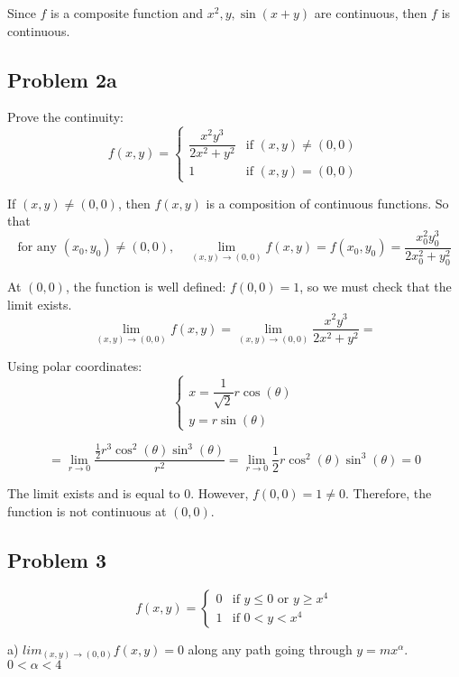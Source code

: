 \documentclass[11pt]{article}
\begin{document}
Since $f$ is a composite function and $x^2, y, \sin(x + y)$ are continuous, then $f$ is continuous.

\subsection*{Problem 2a}
Prove the continuity:
\[
f(x,y) = 
\begin{cases}
    \dfrac{x^2y^3}{2x^2 + y^2} & \text{if } (x,y) \neq (0,0) \\
    1 & \text{if } (x,y) = (0,0)
\end{cases}
\]

If $(x,y) \neq (0,0)$, then $f(x,y)$ is a composition of continuous functions. So that 
\[
\text{for any } (x_0,y_0) \neq (0,0), \quad \lim_{(x,y) \to (0,0)} f(x,y) = f(x_0,y_0) = \dfrac{x_0^2y_0^3}{2x_0^2 + y_0^2}
\]

At $(0,0)$, the function is well defined: $f(0,0) = 1$, so we must check that the limit exists.
\[
\lim_{(x,y) \to (0,0)} f(x,y) = \lim_{(x,y) \to (0,0)} \frac{x^2y^3}{2x^2 + y^2} = 
\]

Using polar coordinates:
\[
\begin{cases}
    x = \dfrac{1}{\sqrt{2}}r \cos(\theta) \\
    y = r \sin(\theta)
\end{cases}
\]

\[
= \lim_{r \to 0} \dfrac{\frac{1}{2} r^3 \cos^2(\theta) \sin^3(\theta)}{r^2} = \lim_{r \to 0} \frac{1}{2} r \cos^2(\theta) \sin^3(\theta) = 0
\]

The limit exists and is equal to 0. However, $f(0,0) = 1 \neq 0$. Therefore, the function is not continuous at $(0,0)$.

\subsection*{Problem 3}
\[
f(x,y) = 
\begin{cases}
    0 & \text{if } y \leq 0 \text{ or } y \geq x^4 \\
    1 & \text{if } 0 < y < x^4
\end{cases}
\]

a) $lim_{(x,y) \to (0,0)} f(x,y) = 0$ along any path going through $y = mx^\alpha$. \quad $0 < \alpha < 4$

\begin{center}
\end{center}
\end{document}
